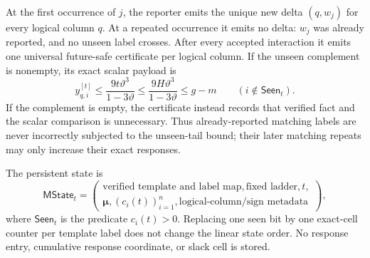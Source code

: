 \begin{theorem}
At the first occurrence of $j$, the reporter emits the unique new delta
$(q,w_j)$ for every logical column $q$.  At a repeated occurrence it emits no
delta: $w_j$ was already reported, and no unseen label crosses.  After every
accepted interaction it emits one universal future-safe certificate per
logical column.  If the unseen complement is nonempty, its exact scalar
payload is
\begin{equation}
 y_{q,i}^{[t]}
 \leq\frac{9t\vartheta^3}{1-3\vartheta}
 \leq\frac{9H\vartheta^3}{1-3\vartheta}
 \leq g-m
 \qquad(i\notin\mathsf{Seen}_t).
 \label{eq:notched-sun-multiplicity-certificate}
\end{equation}
If the complement is empty, the certificate instead records that verified
fact and the scalar comparison is unnecessary.  Thus already-reported
matching labels are never incorrectly subjected to the unseen-tail bound;
their later matching repeats may only increase their exact responses.

The persistent state is
\begin{equation}
 \mathsf{MState}_t
 =\left(
  \begin{gathered}
   \text{verified template and label map},\text{fixed ladder},t,\\
   \boldsymbol\mu,(c_i(t))_{i=1}^{n},
   \text{logical-column/sign metadata}
  \end{gathered}
 \right),
 \label{eq:notched-sun-multiplicity-state}
\end{equation}
where $\mathsf{Seen}_t$ is the predicate $c_i(t)>0$.  Replacing one seen bit
by one exact-cell counter per template label does not change the linear state
order.  No response entry, cumulative response coordinate, or slack cell is
stored.


\end{theorem}
